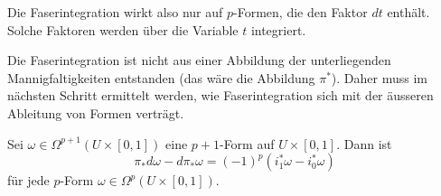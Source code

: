 Die Faserintegration wirkt also nur auf $p$-Formen, die den Faktor $dt$
enthält.
Solche Faktoren werden über die Variable $t$ integriert.

Die Faserintegration ist nicht aus einer Abbildung der unterliegenden
Mannigfaltigkeiten entstanden (das wäre die Abbildung $\pi^*$).
Daher muss im nächsten Schritt ermittelt werden, wie Faserintegration
sich mit der äusseren Ableitung von Formen verträgt.

\begin{satz}[Faserintegration]
Sei $\omega\in\Omega^{p+1}(U\times[0,1])$ eine $p+1$-Form auf $U\times[0,1]$.
Dann  ist
\begin{equation}
\pi_*d\omega - d\pi_*\omega 
=
(-1)^p(i_1^*\omega- i_0^*\omega)
\label{buch:pformen:poincarelemma:eqn:pid}
\end{equation}
für jede $p$-Form $\omega\in\Omega^p(U\times[0,1])$.
\end{satz}

